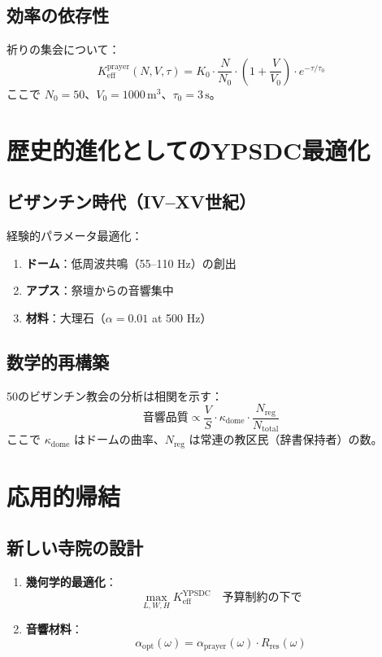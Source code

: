 \documentclass[12pt,a4paper]{article}
\begin{document}
	\subsection{効率の依存性}
	
	祈りの集会について：
	\[
	K_{\mathrm{eff}}^{\mathrm{prayer}}(N, V, \tau) = K_0 \cdot \frac{N}{N_0} \cdot \left(1 + \frac{V}{V_0}\right) \cdot e^{-\tau/\tau_0}
	\]
	ここで $N_0 = 50$、$V_0 = 1000 \, \mathrm{m}^3$、$\tau_0 = 3 \, \mathrm{s}$。
	
	\section{歴史的進化としてのYPSDC最適化}
	
	\subsection{ビザンチン時代（IV–XV世紀）}
	
	経験的パラメータ最適化：
	\begin{enumerate}
		\item \textbf{ドーム}：低周波共鳴（55–110 Hz）の創出
		\item \textbf{アプス}：祭壇からの音響集中
		\item \textbf{材料}：大理石（$\alpha = 0.01$ at 500 Hz）
	\end{enumerate}
	
	\subsection{数学的再構築}
	
	50のビザンチン教会の分析は相関を示す：
	\[
	\text{音響品質} \propto \frac{V}{S} \cdot \kappa_{\mathrm{dome}} \cdot \frac{N_{\mathrm{reg}}}{N_{\mathrm{total}}}
	\]
	ここで $\kappa_{\mathrm{dome}}$ はドームの曲率、$N_{\mathrm{reg}}$ は常連の教区民（辞書保持者）の数。
	
	\section{応用的帰結}
	
	\subsection{新しい寺院の設計}
	
	\begin{enumerate}
		\item \textbf{幾何学的最適化}：
		\[
		\max_{L, W, H} K_{\mathrm{eff}}^{\mathrm{YPSDC}} \quad \text{予算制約の下で}
		\]
		\item \textbf{音響材料}：
		\[
		\alpha_{\mathrm{opt}}(\omega) = \alpha_{\mathrm{prayer}}(\omega) \cdot R_{\mathrm{res}}(\omega)
		\]
	\end{enumerate}
	
\end{document}
